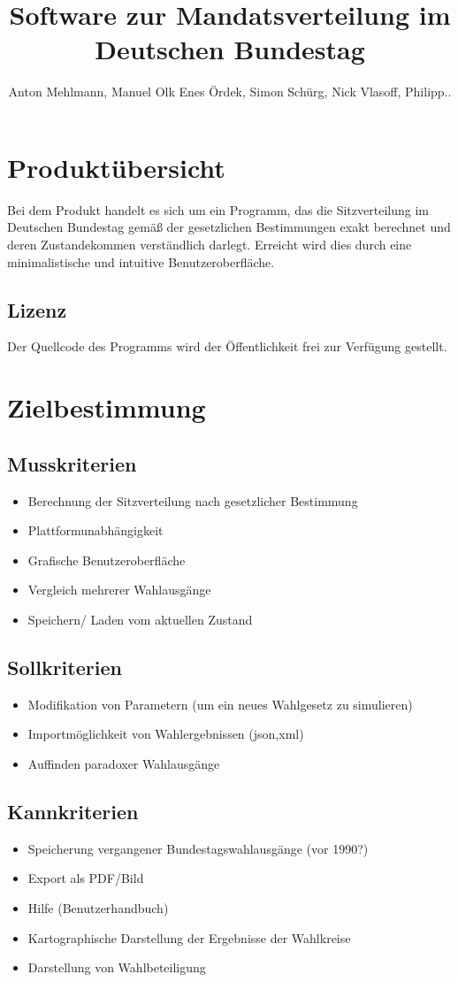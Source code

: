 \documentclass[10pt,a4paper]{article}
\title{Software zur Mandatsverteilung im Deutschen Bundestag}
\author{Anton Mehlmann, Manuel Olk Enes Ördek, Simon Schürg, Nick Vlasoff, Philipp..}
\begin{document}
\maketitle
\tableofcontents

\section{Produktübersicht}
Bei dem Produkt handelt es sich um ein Programm, das die Sitzverteilung im Deutschen Bundestag gemäß der gesetzlichen Bestimmungen exakt berechnet und deren Zustandekommen verständlich darlegt. Erreicht wird dies durch eine minimalistische und intuitive Benutzeroberfläche.

\subsection{Lizenz}
Der Quellcode des Programms wird der Öffentlichkeit frei zur Verfügung gestellt.

\section{Zielbestimmung}
\subsection{Musskriterien}
\begin{itemize}
\item Berechnung der Sitzverteilung nach gesetzlicher Bestimmung
\item Plattformunabhängigkeit
\item Grafische Benutzeroberfläche
\item Vergleich mehrerer Wahlausgänge
\item Speichern/ Laden vom aktuellen Zustand
\end{itemize}

\subsection{Sollkriterien}
\begin{itemize}
\item Modifikation von Parametern (um ein neues Wahlgesetz zu simulieren)
\item Importmöglichkeit von Wahlergebnissen (json,xml)
\item Auffinden paradoxer Wahlausgänge
\end{itemize}


\subsection{Kannkriterien}
\begin{itemize}
\item Speicherung vergangener Bundestagswahlausgänge (vor 1990?)
\item Export als PDF/Bild
\item Hilfe (Benutzerhandbuch)
\item Kartographische Darstellung der Ergebnisse der Wahlkreise
\item Darstellung von Wahlbeteiligung
\end{itemize}
\end{document}
